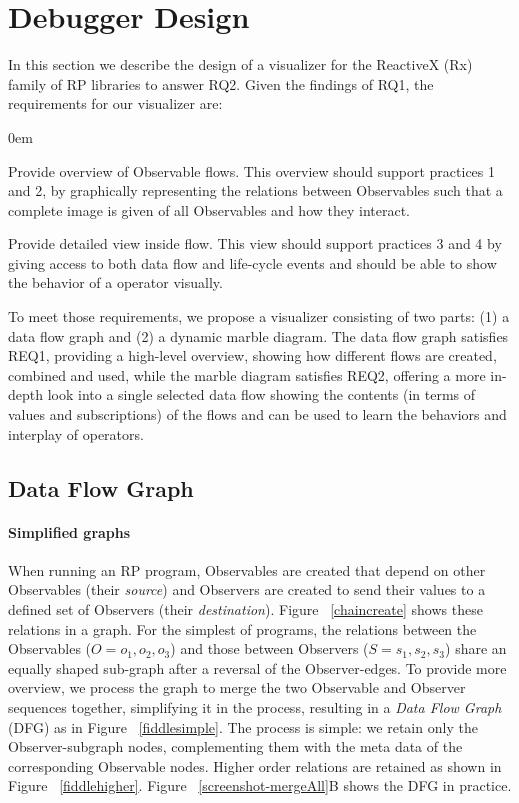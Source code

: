 \section{Debugger Design}%
\label{section-design} In this section we describe the design of a
visualizer for the ReactiveX (Rx) family of RP libraries to answer RQ2.
Given the findings of RQ1, the requirements for our visualizer are:
\begin{description}
        \itemsep0em
    \item[REQ1]
        Provide overview of Observable flows.  This overview should
        support practices 1 and 2, by graphically representing the
        relations between Observables such that a complete image is
        given of all Observables and how they interact.
    \item[REQ2]
        Provide detailed view inside flow.  This view should support
        practices 3 and 4 by giving access to both data flow and
        life-cycle events and should be able to show the behavior of a
        operator visually.
\end{description}

To meet those requirements, we propose a visualizer consisting of two
parts:  (1) a data flow graph and (2) a dynamic marble diagram.  The
data flow graph satisfies REQ1, providing a high-level overview, showing
how different flows are created, combined and used, while the marble
diagram satisfies REQ2, offering a more in-depth look into a single
selected data flow showing the contents (in terms of values and
subscriptions) of the flows and can be used to learn the behaviors and
interplay of operators.

\subsection{Data Flow Graph}
\paragraph{Simplified graphs} When running an RP program, Observables
are created that depend on other Observables (their \emph{source}) and
Observers are created to send their values to a defined set of Observers
(their \emph{destination}).  Figure~%
\ref{chaincreate} shows these relations in a graph.  For the simplest of
programs, the relations between the Observables ($ O = {o_1, o_2, o_3} $)
and those between Observers ($ S = {s_1, s_2, s_3} $) share an equally
shaped sub-graph after a reversal of the Observer-edges.  To provide
more overview, we process the graph to merge the two Observable and
Observer sequences together, simplifying it in the process, resulting in
a \emph{Data Flow Graph} (DFG) as in Figure~%
\ref{fiddlesimple}.  The process is simple:  we retain only the
Observer-subgraph nodes, complementing them with the meta data of the
corresponding Observable nodes.  Higher order relations are retained as
shown in Figure~%
\ref{fiddlehigher}.  Figure~%
\ref{screenshot-mergeAll}B shows the DFG in practice.


